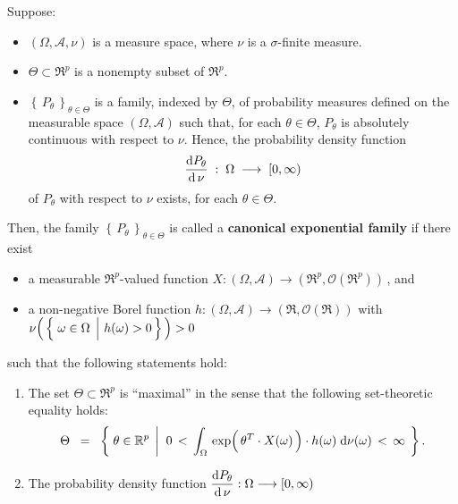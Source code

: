 \begin{definition}
\mbox{}\vskip 0.1cm
\noindent
Suppose:
\begin{itemize}
\item
	$(\Omega,\mathcal{A},\nu)$ is a measure space, where $\nu$ is a $\sigma$-finite measure.
\item
	$\Theta \subset \Re^{p}$ is a nonempty subset of $\Re^{p}$.
\item
	$\left\{\,P_{\theta}\,\right\}_{\theta \in \Theta}$ is a family, indexed by $\Theta$,
	of probability measures defined on the measurable space $(\Omega,\mathcal{A})$ such that,
	for each $\theta \in \Theta$, $P_{\theta}$ is absolutely continuous with respect to $\nu$.
	Hence, the probability density function
	\begin{equation*}
	\dfrac{\textnormal{d} P_{\theta}}{\textnormal{d}\,\nu} \; : \; \Omega \; \longrightarrow \; [0,\infty)
	\end{equation*}
	of $P_{\theta}$ with respect to $\nu$ exists, for each $\theta \in \Theta$.
\end{itemize}
Then, the family $\left\{\,P_{\theta}\,\right\}_{\theta \in \Theta}$ is called a
\textbf{{\color{red}canonical} exponential family}
if there exist
\begin{itemize}
\item
	a measurable $\Re^{p}$-valued function $X : (\Omega,\mathcal{A}) \longrightarrow (\Re^{p},\mathcal{O}(\Re^{p}))$\,, and
\item
	a non-negative Borel function $h : (\Omega,\mathcal{A}) \longrightarrow (\Re,\mathcal{O}(\Re))$ with
	\,$\nu\!\left(\,\left\{\,\left.\omega\overset{{\color{white}.}}{\in}\Omega\,\;\right\vert\,h(\omega) > 0\,\right\}\,\right) > 0$
\end{itemize}
such that the following statements hold:
\begin{enumerate}
\item
	The set $\Theta \subset \Re^{p}$ is ``maximal''
	in the sense that the following set-theoretic equality holds:
	\begin{equation*}
	\Theta
	\;\; = \;\;
		\left\{\;
			\theta \in \Re^{p}
			\;\left\vert\;\;
			0 \, < \,
			\int_{\Omega}\,
				\exp\!\left(\,\theta^{T} \!\overset{{\color{white}-}}{\cdot}\! X(\omega)\,\right) \cdot h(\omega)
			\;\d\nu(\omega)
			\, < \, \infty
			\right.
		\;\right\}.
	\end{equation*}	
\item
	The probability density function
	$\dfrac{\textnormal{d} P_{\theta}}{\textnormal{d}\,\nu} : \Omega \longrightarrow [0,\infty)$

\end{enumerate}
\end{definition}
